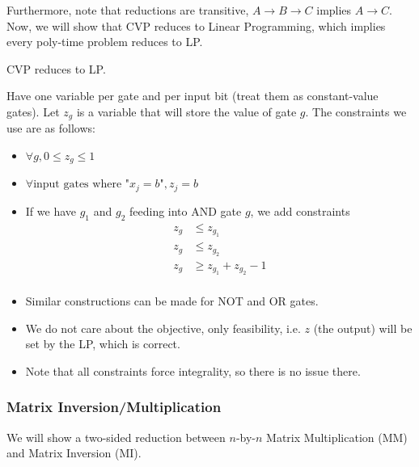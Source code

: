 Furthermore, note that reductions are transitive, $A \to B \to C$ implies $A \to C$. Now, we will show that CVP reduces to Linear Programming,
which implies every poly-time problem reduces to LP.

\begin{theorem}
    CVP reduces to LP.

    \begin{proof*}
        Have one variable per gate and per input bit (treat them as constant-value gates).
        Let $z_g$ is a variable that will store the value of gate $g$. The constraints we use are as follows:
        \begin{itemize}
            \item $\forall g, 0 \leq z_g \leq 1$ \\
            \item $\forall \text{input gates where "$x_j = b$"}, z_j = b$ \\
            \item If we have $g_1$ and $g_2$ feeding into AND gate $g$, we add constraints
            \begin{align*}
                z_g &\leq z_{g_1} \\
                z_g &\leq z_{g_2} \\
                z_g &\geq z_{g_1} + z_{g_2} - 1 \\
            \end{align*}
            \item Similar constructions can be made for NOT and OR gates.
            \item We do not care about the objective, only feasibility, i.e. $z$ (the output) will be set by the LP, which is correct.
            \item Note that all constraints force integrality, so there is no issue there.
        \end{itemize}
    \end{proof*}
\end{theorem}

\subsubsection{Matrix Inversion/Multiplication}
We will show a two-sided reduction between $n$-by-$n$ Matrix Multiplication (MM) and Matrix Inversion (MI).

